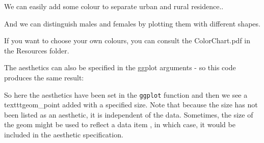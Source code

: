 \documentclass[titlepage]{book}\usepackage{knitr}
\begin{document}
We can easily add some colour to separate urban and rural residence..

\begin{knitrout}
\color{fgcolor}\begin{kframe}
\begin{alltt}
 \hlkwb{<-}  \hlopt{+}
  \hlstd{(}\hlstd{(}      \hlstd{=} \hlstd{)}
\end{alltt}
\end{kframe}
\end{knitrout}

And we can distinguish males and females by plotting them with different shapes.

\begin{knitrout}
\color{fgcolor}\begin{kframe}
\begin{alltt}
 \hlkwb{<-}  \hlopt{+}
  \hlstd{(}\hlstd{(}        \hlstd{=} \hlstd{)}
\end{alltt}
\end{kframe}
\end{knitrout}


If you want to choose your own colours, you can consult the ColorChart.pdf in the Resources folder.

The aesthetics can also be specified in the ggplot arguments - so this code produces the same result:

\begin{knitrout}
\color{fgcolor}\begin{kframe}
\begin{alltt}
 \hlkwb{<-}  \hlstd{(}         \hlopt{+}
  \hlstd{(}\hlstd{=}\hlstd{)}
\end{alltt}
\end{kframe}
\end{knitrout}
So here the aesthetics have been set in the \texttt{ggplot} function and then we see a texttt{geom\_point} added with a specified size. Note that because the size has not been listed as an aesthetic, it is independent of the data.  Sometimes, the size of the geom might be used to reflect a data item , in which case, it would be included in the aesthetic specification.
\end{document}
